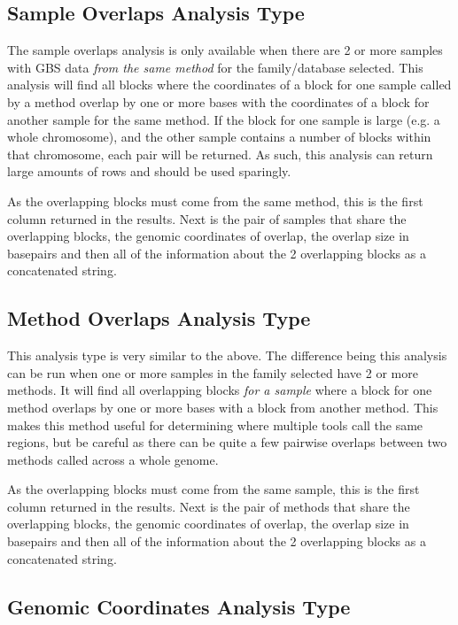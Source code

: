 \documentclass[11pt, a4paper]{article}
\begin{document}
\subsection{Sample Overlaps Analysis Type}\label{sampleOverlapsAnalysisType}

The sample overlaps analysis is only available when there are 2 or more samples with GBS data \textit{from the same method} for the family/database selected. This analysis will find all blocks where the coordinates of a block for one sample called by a method overlap by one or more bases with the coordinates of a block for another sample for the same method. If the block for one sample is large (e.g. a whole chromosome), and the other sample contains a number of blocks within that chromosome, each pair will be returned. As such, this analysis can return large amounts of rows and should be used sparingly.

As the overlapping blocks must come from the same method, this is the first column returned in the results. Next is the pair of samples that share the overlapping blocks, the genomic coordinates of overlap, the overlap size in basepairs and then all of the information about the 2 overlapping blocks as a concatenated string.

\subsection{Method Overlaps Analysis Type}

This analysis type is very similar to the  above. The difference being this analysis can be run when one or more samples in the family selected have 2 or more methods. It will find all overlapping blocks \textit{for a sample} where a block for one method overlaps by one or more bases with a block from another method. This makes this method useful for determining where multiple tools call the same regions, but be careful as there can be quite a few pairwise overlaps between two methods called across a whole genome.

As the overlapping blocks must come from the same sample, this is the first column returned in the results. Next is the pair of methods that share the overlapping blocks, the genomic coordinates of overlap, the overlap size in basepairs and then all of the information about the 2 overlapping blocks as a concatenated string.

\subsection{Genomic Coordinates Analysis Type}
\end{document}
